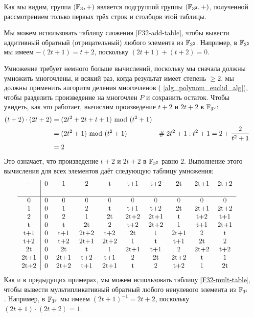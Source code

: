 \begin{example}
Как мы видим, группа $(\mathbb{F}_3,+)$ является подгруппой группы $(\mathbb{F}_{3^2},+)$, полученной рассмотрением только первых трёх строк и столбцов этой таблицы.

Мы можем использовать таблицу сложения \eqref{F32-add-table}, чтобы вывести аддитивный обратный (отрицательный) любого элемента из $\mathbb{F}_{3^2}$. Например, в $\mathbb{F}_{3^2}$ мы имеем $-(2t+1)= t+2$, поскольку $(2t+1) + (t+2)=0$.

Умножение требует немного больше вычислений, поскольку мы сначала должны умножить многочлены, и всякий раз, когда результат имеет степень $\geq 2$, мы должны применить алгоритм деления многочленов (\algname{} \ref{alg_polynom_euclid_alg}), чтобы разделить произведение на многочлен $P$ и сохранить остаток. Чтобы увидеть, как это работает, вычислим произведение $t+2$ и $2t+2$ в $\mathbb{F}_{3^2}$:
\begin{align*}
(t+2) \cdot (2t+2) &= (2t^2 + 2t + t + 1) \text{ mod } (t^2+1) \\
                   &= (2t^2+1) \text{ mod } (t^2+1) & \#\; 2t^2+1:t^2+1= 2 + \frac{2}{t^2+1} \\
                   &= 2
\end{align*}
Это означает, что произведение $t+2$ и $2t+2$ в $\mathbb{F}_{3^2}$ равно $2$. Выполнение этого вычисления для всех элементов даёт следующую таблицу умножения:
\begin{equation}\label{F32-mult-table}
  \begin{tabular}{c | c c c c c c c c c}
$\cdot$ & 0    & 1    & 2    & t    & t+1  & t+2  & 2t   & 2t+1 & 2t+2 \\\\\hline
      0 & 0    & 0    & 0    & 0    & 0    & 0    & 0    & 0    & 0 \\
      1 & 0    & 1    & 2    & t    & t+1  & t+2  & 2t   & 2t+1 & 2t+2\\
      2 & 0    & 2    & 1    & 2t   & 2t+2 & 2t+1 & t    & t+2  & t+1 \\
      t & 0    & t    & 2t   & 2    & t+2  & 2t+2 & 1    & t+1  & 2t+1  \\
    t+1 & 0    & t+1  & 2t+2 & t+2  & 2t   & 1    & 2t+1 & 2    & t   \\
    t+2 & 0    & t+2  & 2t+1 & 2t+2 & 1    & t    & t+1  & 2t   & 2    \\
     2t & 0    & 2t   & t    & 1    & 2t+1 & t+1  & 2  & 2t+2 & t+2\\
   2t+1 & 0    & 2t+1 & t+2  & t+1  & 2    & 2t   & 2t+2 & t    & 1    \\
   2t+2 & 0    & 2t+2 & t+1  & 2t+1 & t    & 2    & t+2  & 1     & 2t
  \end{tabular}
\end{equation}
Как и в предыдущих примерах, мы можем использовать таблицу \eqref{F32-mult-table}, чтобы вывести мультипликативный обратный любого ненулевого элемента из $\mathbb{F}_{3^2}$. Например, в $\mathbb{F}_{3^2}$ мы имеем $(2t+1)^{-1}= 2t+2 $, поскольку $(2t+1) \cdot (2t+2)=1$.


\end{example}
